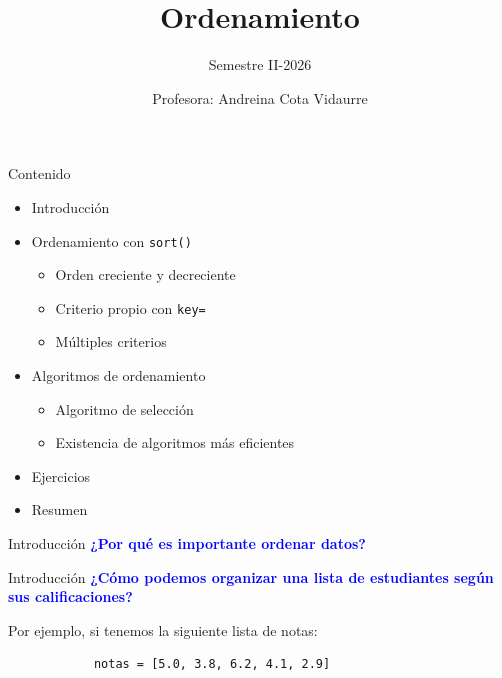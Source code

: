 \documentclass{beamer}
\title{Ordenamiento}
\subtitle{Semestre II-2026}
\author{Profesora: Andreina Cota Vidaurre}
\begin{document}
  \shorthandoff{-}
  \frame[c]{\maketitle}

    \begin{frame}{Contenido}
        \begin{itemize}
            \item Introducción
            \item Ordenamiento con \texttt{sort()}
            \begin{itemize}
                \item Orden creciente y decreciente
                \item Criterio propio con \texttt{key=}
                \item Múltiples criterios
            \end{itemize}
            \item Algoritmos de ordenamiento
            \begin{itemize}
                \item Algoritmo de selección
                \item Existencia de algoritmos más eficientes
            \end{itemize}
            \item Ejercicios
            \item Resumen
        \end{itemize}
    \end{frame}

    \begin{frame}{Introducción}
        \textcolor{blue}{\textbf{¿Por qué es importante ordenar datos?}}
    \end{frame}

    \begin{frame}[fragile, t]{Introducción}
        \textcolor{blue}{\textbf{¿Cómo podemos organizar una lista de estudiantes según sus calificaciones?}}
        
        Por ejemplo, si tenemos la siguiente lista de notas:

        \begin{verbatim}
            notas = [5.0, 3.8, 6.2, 4.1, 2.9]
        \end{verbatim}
    \end{frame}
\end{document}
